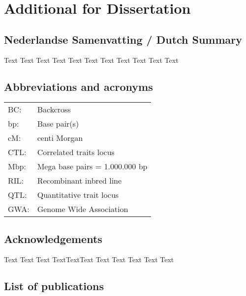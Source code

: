 \documentclass[8pt, twoside, a5paper]{report}
\begin{document}
\chapter{Additional for Dissertation}
\section*{Nederlandse Samenvatting / Dutch Summary}
Text Text Text Text Text Text Text Text Text Text Text

\section*{Abbreviations and acronyms}
\begin{tabular}{ l l }
BC:          & Backcross \\
bp:          & Base pair(s) \\
cM:          & centi Morgan \\
CTL:         & Correlated traits locus \\
Mbp:         & Mega base pairs = 1.000.000 bp \\
RIL:         & Recombinant inbred line \\
QTL:         & Quantitative trait locus \\
GWA:         & Genome Wide Association \\
\end{tabular}

\newpage

\section*{Acknowledgements}
Text Text Text TextTextText Text Text Text Text Text

\newpage

\section*{List of publications}
\end{document}
